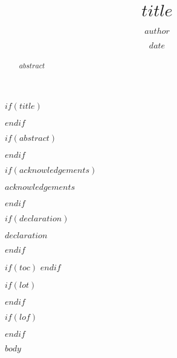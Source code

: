 \documentclass[12pt,oneside]{sussexthesis}
\title{$title$}
\author{$author$}
\date{$date$}
\begin{document}
\frontmatter %
\pagestyle{empty} %


$if(title)$
  \maketitle
$endif$

\raggedright

\setlength{\parindent}{36pt}

$if(abstract)$
\begin{abstract}
    $abstract$
    
\end{abstract}
$endif$

$if(acknowledgements)$
  \begin{acknowledgements}
    $acknowledgements$
  \end{acknowledgements}
$endif$

$if(declaration)$
  \begin{declaration}
    $declaration$
  \end{declaration}
$endif$


$if(toc)$
  \hypersetup{hidelinks}
  \setcounter{secnumdepth}{0}
  \setcounter{tocdepth}{1}
  \tableofcontents
$endif$

$if(lot)$
  \listoftables
$endif$

$if(lof)$
  \listoffigures
$endif$

\mainmatter %
\pagestyle{fancyplain} %


$body$


\end{document}
